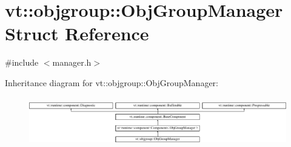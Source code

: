 \hypertarget{structvt_1_1objgroup_1_1_obj_group_manager}{}\section{vt\+:\+:objgroup\+:\+:Obj\+Group\+Manager Struct Reference}
\label{structvt_1_1objgroup_1_1_obj_group_manager}


{\ttfamily \#include $<$manager.\+h$>$}

Inheritance diagram for vt\+:\+:objgroup\+:\+:Obj\+Group\+Manager\+:\begin{figure}[H]
\begin{center}
\leavevmode
\includegraphics[height=2.176871cm]{structvt_1_1objgroup_1_1_obj_group_manager}
\end{center}
\end{figure}
